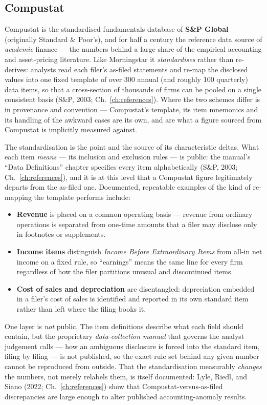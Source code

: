 \documentclass[11pt,a4paper]{report}
\begin{document}
\subsection{Compustat}
\label{sec:schemes-compustat}

Compustat is the standardised fundamentals database of \textbf{S\&P Global} (originally Standard \& Poor's),
and for half a century the reference data source of \emph{academic} finance --- the numbers behind a large
share of the empirical accounting and asset-pricing literature. Like Morningstar it \emph{standardises} rather
than re-derives: analysts read each filer's as-filed statements and re-map the disclosed values into one fixed
template of over 300 annual (and roughly 100 quarterly) data items, so that a cross-section of thousands of
firms can be pooled on a single consistent basis (S\&P, 2003; Ch.~\ref{ch:references}). Where the two schemes
differ is in provenance and convention --- Compustat's template, its item mnemonics and its handling of the
awkward cases are its own, and are what a figure sourced from Compustat is implicitly measured against.

The standardisation is the point and the source of its characteristic deltas. What each item \emph{means} ---
its inclusion and exclusion rules --- is public: the manual's ``Data Definitions'' chapter specifies every
item alphabetically (S\&P, 2003; Ch.~\ref{ch:references}), and it is at this level that a Compustat figure
legitimately departs from the as-filed one. Documented, repeatable examples of the kind of re-mapping the
template performs include:
\begin{itemize}
  \item \textbf{Revenue} is placed on a common operating basis --- revenue from ordinary operations is
    separated from one-time amounts that a filer may disclose only in footnotes or supplements.
  \item \textbf{Income items} distinguish \emph{Income Before Extraordinary Items} from all-in net income on
    a fixed rule, so ``earnings'' means the same line for every firm regardless of how the filer partitions
    unusual and discontinued items.
  \item \textbf{Cost of sales and depreciation} are disentangled: depreciation embedded in a filer's cost of
    sales is identified and reported in its own standard item rather than left where the filing books it.
\end{itemize}

One layer is \emph{not} public. The item definitions describe what each field should contain, but the
proprietary \emph{data-collection manual} that governs the analyst judgement calls --- how an ambiguous
disclosure is forced into the standard item, filing by filing --- is not published, so the exact rule set
behind any given number cannot be reproduced from outside. That the standardisation measurably \emph{changes}
the numbers, not merely relabels them, is itself documented: Lyle, Riedl, and Siano (2022;
Ch.~\ref{ch:references}) show that Compustat-versus-as-filed discrepancies are large enough to alter published
accounting-anomaly results.
\end{document}
